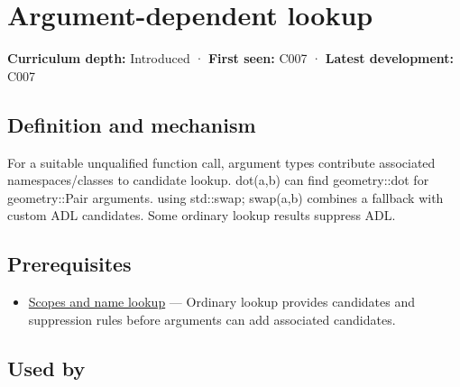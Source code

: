 \hypertarget{appendix-7863714aa97f}{}\label{referencestart:appendix-7863714aa97f}
\section{Argument-dependent lookup}\label{appendix-7863714aa97f-argument-dependent-lookup}

\hypertarget{appendix-7863714aa97f-argument-dependent-lookup}{}

\textbf{Curriculum depth:} Introduced · \textbf{First seen:} C007 · \textbf{Latest development:} C007

\begin{allmightroledefinition}

\subsection{Definition and mechanism}\label{appendix-7863714aa97f-definition-and-mechanism}

\hypertarget{appendix-7863714aa97f-definition-and-mechanism}{}

For a suitable unqualified function call, argument types contribute associated namespaces/classes to candidate lookup. dot(a,b) can find geometry::dot for geometry::Pair arguments. using std::swap; swap(a,b) combines a fallback with custom ADL candidates. Some ordinary lookup results suppress ADL.

\end{allmightroledefinition}

\subsection{Prerequisites}\label{appendix-7863714aa97f-prerequisites}

\hypertarget{appendix-7863714aa97f-prerequisites}{}

\begin{itemize}
\tightlist
\item
  \hyperref[appendix-b12b31759da1]{Scopes and name lookup} --- Ordinary lookup provides candidates and suppression rules before arguments can add associated candidates.
\end{itemize}

\subsection{Used by}\label{appendix-7863714aa97f-used-by}

\hypertarget{appendix-7863714aa97f-used-by}{}

